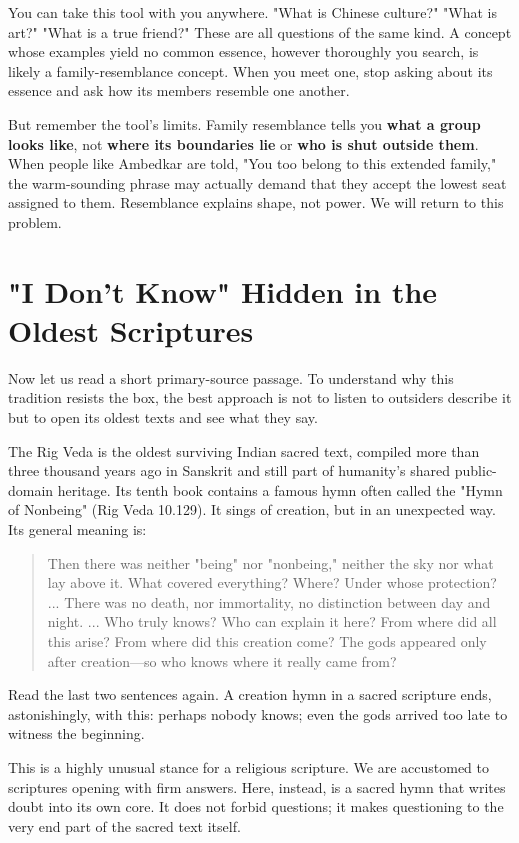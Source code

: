 You can take this tool with you anywhere. "What is Chinese culture?" "What is art?" "What is a true friend?" These are all questions of the same kind. A concept whose examples yield no common essence, however thoroughly you search, is likely a family-resemblance concept. When you meet one, stop asking about its essence and ask how its members resemble one another.

But remember the tool's limits. Family resemblance tells you \textbf{what a group looks like}, not \textbf{where its boundaries lie} or \textbf{who is shut outside them}. When people like Ambedkar are told, "You too belong to this extended family," the warm-sounding phrase may actually demand that they accept the lowest seat assigned to them. Resemblance explains shape, not power. We will return to this problem.

\section{"I Don't Know" Hidden in the Oldest Scriptures}
Now let us read a short primary-source passage. To understand why this tradition resists the box, the best approach is not to listen to outsiders describe it but to open its oldest texts and see what they say.

The Rig Veda is the oldest surviving Indian sacred text, compiled more than three thousand years ago in Sanskrit and still part of humanity's shared public-domain heritage. Its tenth book contains a famous hymn often called the "Hymn of Nonbeing" (Rig Veda 10.129). It sings of creation, but in an unexpected way. Its general meaning is:

\begin{quote}
Then there was neither "being" nor "nonbeing," neither the sky nor what lay above it. What covered everything? Where? Under whose protection? ... There was no death, nor immortality, no distinction between day and night. ... Who truly knows? Who can explain it here? From where did all this arise? From where did this creation come? The gods appeared only after creation---so who knows where it really came from?
\end{quote}
Read the last two sentences again. A creation hymn in a sacred scripture ends, astonishingly, with this: perhaps nobody knows; even the gods arrived too late to witness the beginning.

This is a highly unusual stance for a religious scripture. We are accustomed to scriptures opening with firm answers. Here, instead, is a sacred hymn that writes doubt into its own core. It does not forbid questions; it makes questioning to the very end part of the sacred text itself.

